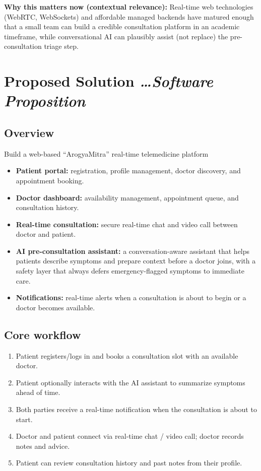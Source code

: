 \documentclass[11pt,a4paper]{article}
\newcommand{\BvrHint}[1]{%
{\normalfont\normalsize\itshape\hfill #1}}
\begin{document}
\textbf{Why this matters now (contextual relevance):}
Real-time web technologies (WebRTC, WebSockets) and
affordable managed backends have matured enough that a
small team can build a credible consultation platform
in an academic timeframe, while conversational AI can
plausibly assist (not replace) the pre-consultation
triage step.

\section{Proposed Solution %
\BvrHint{\ldots Software Proposition}}
\subsection{Overview}
Build a web-based ``ArogyaMitra'' real-time
telemedicine platform
\begin{itemize}[leftmargin=0.7cm]
\item \textbf{Patient portal:} registration, profile management, doctor discovery, and appointment booking.
\item \textbf{Doctor dashboard:} availability management, appointment queue, and consultation history.
\item \textbf{Real-time consultation:} secure real-time chat and video call between doctor and patient.
\item \textbf{AI pre-consultation assistant:} a conversation-aware assistant that helps patients describe symptoms and prepare context before a doctor joins, with a safety layer that always defers emergency-flagged symptoms to immediate care.
\item \textbf{Notifications:} real-time alerts when a consultation is about to begin or a doctor becomes available.
\end{itemize}

\subsection{Core workflow}
\begin{enumerate}[leftmargin=0.7cm]
\item Patient registers/logs in and books a consultation slot with an available doctor.
\item Patient optionally interacts with the AI assistant to summarize symptoms ahead of time.
\item Both parties receive a real-time notification when the consultation is about to start.
\item Doctor and patient connect via real-time chat / video call; doctor records notes and advice.
\item Patient can review consultation history and past notes from their profile.
\end{enumerate}
\end{document}
